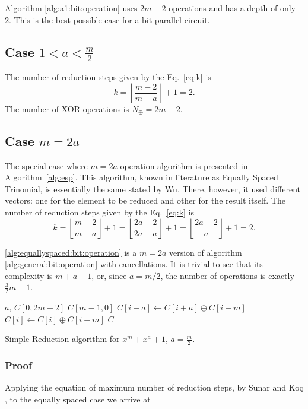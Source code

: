 Algorithm \ref{alg:a1:bit:operation}  uses $2m - 2$ operations and has a depth of only 2. This is the best possible case for a bit-parallel circuit.

\subsection{Case $ 1 < a < \frac{m}{2}$}
The number of reduction steps given by the Eq.~\ref{eq:k} is $$k=\left \lfloor \frac{m-2}{m-a} \right \rfloor + 1=2.$$ The number of XOR operations is $N_\oplus = 2m-2$.

\subsection{Case $m=2a$}
The special case where $m=2a$ operation algorithm is presented in Algorithm~\ref{alg:esp}. This algorithm, known in literature as Equally Spaced Trinomial, is essentially the same stated by Wu\cite[p. 753, Eq. 3]{Wu2002}. There, however, it used different vectors: one for the element to be reduced and other for the result itself. The number of reduction steps given by the Eq.~\ref{eq:k} is $$k=\left \lfloor \frac{m-2}{m-a} \right \rfloor + 1=\left \lfloor \frac{2a-2}{2a-a} \right \rfloor + 1=\left \lfloor \frac{2a-2}{a} \right \rfloor + 1=2.$$ 

\ref{alg:equallyspaced:bit:operation} is a $m=2a$ version of algorithm \ref{alg:general:bit:operation} with cancellations. It is trivial to see that its complexity is $m + a - 1$, or, since $a = m/2$, the number of operations is exactly $\frac{3}{2}m - 1$.

\begin{algorithm}
\begin{algorithmic}[1]
  \REQUIRE $a$, $C[0,2m-2]$
  \ENSURE $C[m-1,0]$
    \STATE $C[i+a] \gets C[i+a] \oplus C[i+m]$
    \ENDFOR
    \STATE $C[i] \gets C[i] \oplus C[i+m]$
    \ENDFOR
  \RETURN $C$
  \caption{Simple Reduction algorithm for $x^{m} + x^a +1$, $a = \frac{m}{2}$.}
  \label{alg:equallyspaced:bit:operation}
\end{algorithmic}
\end{algorithm}

\subsubsection{Proof}

Applying the equation of maximum number of reduction steps, by Sunar and Ko\c{c} \cite{SunarKoc}, to the equally spaced case we arrive at

